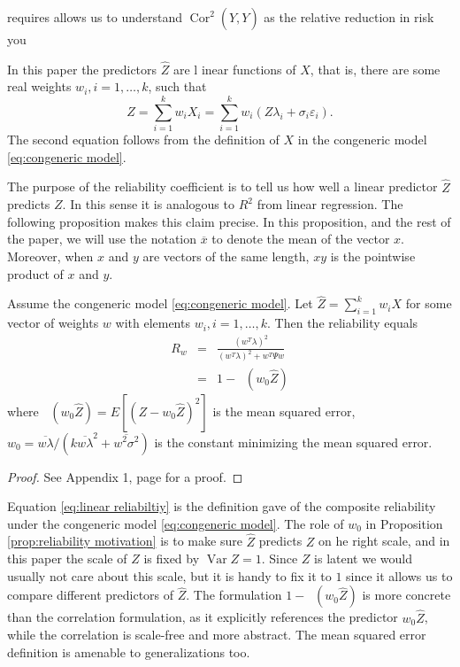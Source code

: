 \documentclass[twoside]{article}
\DeclareMathOperator{\Var}{Var}
\DeclareMathOperator{\Cor}{Cor}
\DeclareMathOperator{\MSE}{MSE_Z}
\begin{document}
 requires 
 allows us to understand $\Cor^2(\hat{Y},Y)$ as the relative reduction in risk you 

In this paper the predictors $\hat{Z}$ are l inear functions of $X$, that is, there are some real weights $w_{i},i=1,\ldots,k$, such that
\begin{equation}
\label{eq:Linear predictor}
\hat{Z} =  \sum_{i=1}^{k} w_{i}X_i = \sum_{i=1}^{k}w_{i}(Z\lambda_i + \sigma_{i} \varepsilon_i).\nonumber 
\end{equation}
The second equation follows from the definition of $X$ in the congeneric model \eqref{eq:congeneric model}. 


The purpose of the reliability coefficient is to tell us how well a linear predictor $\hat{Z}$ predicts $Z$. In this sense it is analogous to $R^2$ from linear regression. The following proposition makes this claim precise. In this proposition, and the rest of the paper, we will use the notation $\overline{x}$ to denote the mean of the vector $x$. Moreover, when $x$ and $y$ are vectors of the same length, $xy$ is the pointwise product of $x$ and $y$.

\begin{prop}
\label{prop:reliability motivation}Assume the congeneric model \eqref{eq:congeneric model}. Let $\hat{Z}=\sum_{i=1}^{k}w_{i}X$
for some vector of weights $w$ with elements $w_{i},i=1,\ldots,k$. Then the reliability equals
\begin{eqnarray}
 R_w & = & \frac{(w^{T}\lambda)^{2}}{(w^{T}\lambda)^{2}+w^{T}\Psi w}\label{eq:linear reliabiltiy}\\
 & = & 1- \MSE (w_{0}\hat{Z})\label{eq:MSE}
\end{eqnarray}
where $\MSE (w_{0}\hat{Z})=E[(Z-w_{0}\hat{Z})^{2}]$ is the
mean squared error, $w_{0}=\overline{w\lambda}/(k\overline{w\lambda}^{2}+\overline{w^{2}\sigma^{2}})$ is the constant minimizing the mean squared error.
\end{prop}
\begin{proof}
See Appendix 1, page \pageref{proof:reliability motivation} for a proof.
\end{proof}

Equation \eqref{eq:linear reliabiltiy} is the definition \citet[][p. 112]{Joreskog1971-nn} gave of the composite reliability under the congeneric model \eqref{eq:congeneric model}. 
The role of $w_0$ in Proposition \ref{prop:reliability motivation} is to make sure $\hat{Z}$ predicts $Z$ on he right scale, and in this paper the scale of $Z$ is fixed by $\Var Z = 1$. Since $Z$ is latent we would usually not care about this scale, but it is handy to fix it to $1$ since it allows us to compare different predictors of $\hat{Z}$. The formulation $1-\MSE (w_{0}\hat{Z})$ is more concrete than the correlation formulation, as it explicitly references the predictor $w_{0}\hat{Z}$, while the correlation is scale-free and more abstract. The mean squared error definition is amenable to generalizations too.
\end{document}
